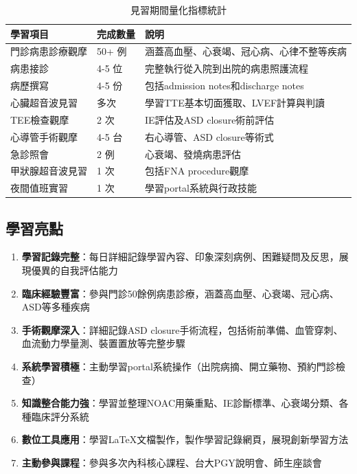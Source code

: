 \documentclass[12pt,a4paper]{article}
\begin{document}
\begin{table}[h]
\centering
\caption{見習期間量化指標統計}
\begin{tabular}{|p{4cm}|p{2cm}|p{6cm}|}
\hline
\textbf{學習項目} & \textbf{完成數量} & \textbf{說明} \\
\hline
門診病患診療觀摩 & 50+ 例 & 涵蓋高血壓、心衰竭、冠心病、心律不整等疾病 \\
\hline
病患接診 & 4-5 位 & 完整執行從入院到出院的病患照護流程 \\
\hline
病歷撰寫 & 4-5 份 & 包括admission notes和discharge notes \\
\hline
心臟超音波見習 & 多次 & 學習TTE基本切面獲取、LVEF計算與判讀 \\
\hline
TEE檢查觀摩 & 2 次 & IE評估及ASD closure術前評估 \\
\hline
心導管手術觀摩 & 4-5 台 & 右心導管、ASD closure等術式 \\
\hline
急診照會 & 2 例 & 心衰竭、發燒病患評估 \\
\hline
甲狀腺超音波見習 & 1 次 & 包括FNA procedure觀摩 \\
\hline
夜間值班實習 & 1 次 & 學習portal系統與行政技能 \\
\hline
\end{tabular}
\end{table}

\subsection{學習亮點}

\begin{enumerate}
\item \textbf{學習記錄完整}：每日詳細記錄學習內容、印象深刻病例、困難疑問及反思，展現優異的自我評估能力
\item \textbf{臨床經驗豐富}：參與門診50餘例病患診療，涵蓋高血壓、心衰竭、冠心病、ASD等多種疾病
\item \textbf{手術觀摩深入}：詳細記錄ASD closure手術流程，包括術前準備、血管穿刺、血流動力學量測、裝置置放等完整步驟
\item \textbf{系統學習積極}：主動學習portal系統操作（出院病摘、開立藥物、預約門診檢查）
\item \textbf{知識整合能力強}：學習並整理NOAC用藥重點、IE診斷標準、心衰竭分類、各種臨床評分系統
\item \textbf{數位工具應用}：學習LaTeX文檔製作，製作學習記錄網頁，展現創新學習方法
\item \textbf{主動參與課程}：參與多次內科核心課程、台大PGY說明會、師生座談會
\end{enumerate}
\end{document}
